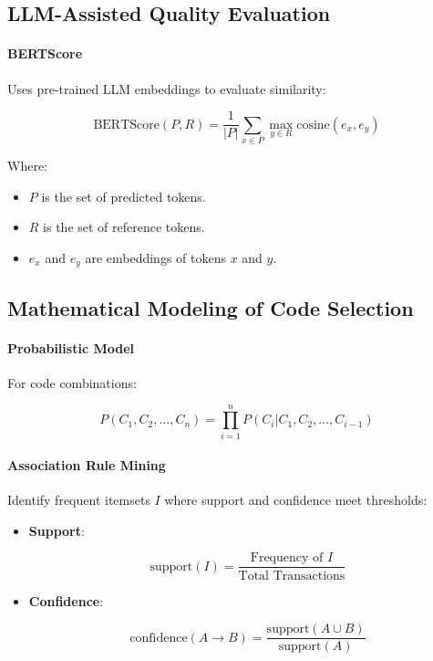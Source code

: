 \documentclass[12pt, a4paper]{article}
\begin{document}
\subsection{LLM-Assisted Quality Evaluation}

\paragraph{BERTScore}

Uses pre-trained LLM embeddings to evaluate similarity:

\begin{equation}
\text{BERTScore}(P, R) = \frac{1}{|P|} \sum_{x \in P} \max_{y \in R} \text{cosine}(e_x, e_y)
\end{equation}

Where:

\begin{itemize}
    \item \( P \) is the set of predicted tokens.
    \item \( R \) is the set of reference tokens.
    \item \( e_x \) and \( e_y \) are embeddings of tokens \( x \) and \( y \).
\end{itemize}

\subsection{Mathematical Modeling of Code Selection}

\paragraph{Probabilistic Model}

For code combinations:

\begin{equation}
P(C_1, C_2, \dots, C_n) = \prod_{i=1}^{n} P(C_i | C_{1}, C_{2}, \dots, C_{i-1})
\end{equation}

\paragraph{Association Rule Mining}

Identify frequent itemsets \( I \) where support and confidence meet thresholds:

\begin{itemize}
    \item \textbf{Support}:

    \begin{equation}
    \text{support}(I) = \frac{\text{Frequency of } I}{\text{Total Transactions}}
    \end{equation}

    \item \textbf{Confidence}:

    \begin{equation}
    \text{confidence}(A \rightarrow B) = \frac{\text{support}(A \cup B)}{\text{support}(A)}
    \end{equation}
\end{itemize}
\end{document}
